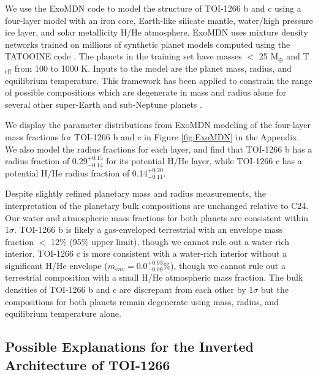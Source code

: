 \documentclass[twocolumn]{aastex631}
\begin{document}
We use the ExoMDN code \cite{Baumeister2023} to model the structure of TOI-1266 b and c using a four-layer model with an iron core, Earth-like silicate mantle, water/high pressure ice layer, and solar metallicity H/He atmosphere. ExoMDN uses mixture density networks trained on millions of synthetic planet models computed using the TATOOINE code \citep{Baumeister2020,MacKenzie2023}. The planets in the training set have masses $<$ 25 M$_{\oplus}$ and T$_{\mathrm{eff}}$ from 100 to 1000 K. Inputs to the model are the planet mass, radius, and equilibrium temperature. This framework has been applied to constrain the range of possible compositions which are degenerate in mass and radius alone for several other super-Earth and sub-Neptune planets \citep[e.g.,][]{Murgas2024,SuarezMascareno2024,Hobson2024}.

We display the parameter distributions from ExoMDN modeling of the four-layer mass fractions for TOI-1266 b and c in Figure \ref{fig:ExoMDN} in the Appendix. We also model the radius fractions for each layer, and find that TOI-1266 b has a radius fraction of 0.29$^{+0.15}_{-0.14}$ for its potential H/He layer, while TOI-1266 c has a potential H/He radius fraction of 0.14$^{+0.20}_{-0.11}$.

Despite slightly refined planetary mass and radius measurements, the interpretation of the planetary bulk compositions are unchanged relative to C24. Our water and atmospheric mass fractions for both planets are consistent within 1$\sigma$. TOI-1266 b is likely a gas-enveloped terrestrial with an envelope mass fraction $<$ 12\% (95\% upper limit), though we cannot rule out a water-rich interior. TOI-1266 c is more consistent with a water-rich interior without a significant H/He envelope ($m_{env} = 0.0^{+0.03}_{-0.00}\%$), though we cannot rule out a terrestrial composition with a small H/He atmospheric mass fraction. The bulk densities of TOI-1266 b and c are discrepant from each other by 1$\sigma$ but the compositions for both planets remain degenerate using mass, radius, and equilibrium temperature alone. 

\subsection{Possible Explanations for the Inverted Architecture of TOI-1266}  \label{sec:discussion}
\end{document}
